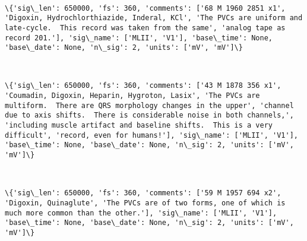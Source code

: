 \documentclass[11pt]{article}
\begin{document}
    \begin{center}
    \end{center}
    { \hspace*{\fill} \\}
    
    \begin{Verbatim}[commandchars=\\\{\}]
\{'sig\_len': 650000, 'fs': 360, 'comments': ['68 M 1960 2851 x1', 'Digoxin, Hydrochlorthiazide, Inderal, KCl', 'The PVCs are uniform and late-cycle.  This record was taken from the same', 'analog tape as record 201.'], 'sig\_name': ['MLII', 'V1'], 'base\_time': None, 'base\_date': None, 'n\_sig': 2, 'units': ['mV', 'mV']\}

    \end{Verbatim}

    \begin{center}
    \end{center}
    { \hspace*{\fill} \\}
    
    \begin{Verbatim}[commandchars=\\\{\}]
\{'sig\_len': 650000, 'fs': 360, 'comments': ['43 M 1878 356 x1', 'Coumadin, Digoxin, Heparin, Hygroton, Lasix', 'The PVCs are multiform.  There are QRS morphology changes in the upper', 'channel due to axis shifts.  There is considerable noise in both channels,', 'including muscle artifact and baseline shifts.  This is a very difficult', 'record, even for humans!'], 'sig\_name': ['MLII', 'V1'], 'base\_time': None, 'base\_date': None, 'n\_sig': 2, 'units': ['mV', 'mV']\}

    \end{Verbatim}

    \begin{center}
    \end{center}
    { \hspace*{\fill} \\}
    
    \begin{Verbatim}[commandchars=\\\{\}]
\{'sig\_len': 650000, 'fs': 360, 'comments': ['59 M 1957 694 x2', 'Digoxin, Quinaglute', 'The PVCs are of two forms, one of which is much more common than the other.'], 'sig\_name': ['MLII', 'V1'], 'base\_time': None, 'base\_date': None, 'n\_sig': 2, 'units': ['mV', 'mV']\}

    \end{Verbatim}
\end{document}
